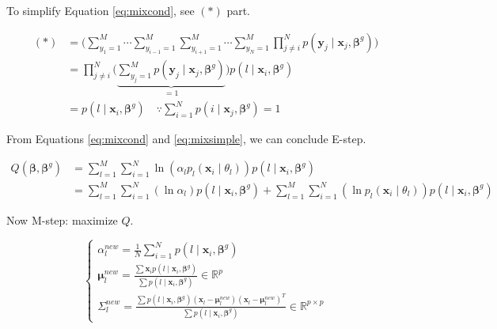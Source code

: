 \documentclass[]{book}
\theoremstyle{definition}
\theoremstyle{definition}
\theoremstyle{definition}
\theoremstyle{remark}
\begin{document}
To simplify Equation \eqref{eq:mixcond}, see \((\ast)\) part.

\begin{equation}
  \begin{split}
    (\ast) & = \bigg( \sum_{y_1 = 1}^M \cdots \sum_{y_{i - 1} = 1}^M \sum_{y_{i + 1} = 1}^M \cdots \sum_{y_N = 1}^M \prod_{j \neq i}^N p(\mathbf{y}_j \mid \mathbf{x}_j, \boldsymbol\beta^g) \bigg) \\
    & = \prod_{j \neq i}^N \bigg( \underbrace{\sum_{y_j = 1}^M p(\mathbf{y}_j \mid \mathbf{x}_j, \boldsymbol\beta^g)}_{= 1} \bigg) p(l \mid \mathbf{x}_i, \boldsymbol\beta^g) \\
    & = p(l \mid \mathbf{x}_i, \boldsymbol\beta^g) \quad \because \sum_{i = 1}^N p(i \mid \mathbf{x}_j, \boldsymbol\beta^g) = 1
  \end{split}
  \label{eq:mixsimple}
\end{equation}

From Equations \eqref{eq:mixcond} and \eqref{eq:mixsimple}, we can conclude E-step.

\begin{equation}
  \begin{split}
    Q(\boldsymbol\beta, \boldsymbol\beta^g) & = \sum_{l = 1}^M \sum_{i = 1}^N \ln (\alpha_l p_l (\mathbf{x}_i \mid \theta_l)) p(l \mid \mathbf{x}_i, \boldsymbol\beta^g) \\
    & = \sum_{l = 1}^M \sum_{i = 1}^N (\ln \alpha_l) p(l \mid \mathbf{x}_i, \boldsymbol\beta^g) + \sum_{l = 1}^M \sum_{i = 1}^N (\ln p_l (\mathbf{x}_i \mid \theta_l)) p(l \mid \mathbf{x}_i, \boldsymbol\beta^g)
  \end{split}
  \label{eq:mixestep}
\end{equation}

Now M-step: maximize \(Q\).

\begin{equation}
  \begin{cases}
    \alpha_l^{new} = \frac{1}{N} \sum_{i = 1}^N p(l \mid \mathbf{x}_i, \boldsymbol\beta^g) \\
    \boldsymbol\mu_l^{new} = \frac{\sum \mathbf{x}_i p(l \mid \mathbf{x}_i, \boldsymbol\beta^g)}{\sum p(l \mid \mathbf{x}_i, \boldsymbol\beta^g)} \in \mathbb{R}^p \\
    \Sigma_l^{new} = \frac{\sum p(l \mid \mathbf{x}_i, \boldsymbol\beta^g) (\mathbf{x}_l - \boldsymbol\mu_l^{new}) (\mathbf{x}_l - \boldsymbol\mu_l^{new})^T}{\sum p(l \mid \mathbf{x}_i, \boldsymbol\beta^g)} \in \mathbb{R}^{p \times p}
  \end{cases}
  \label{eq:mixmstep}
\end{equation}
\end{document}
